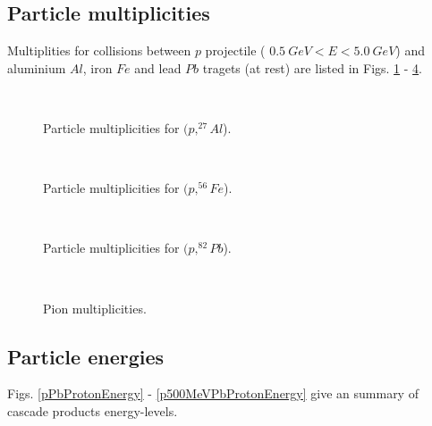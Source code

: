 \subsection{Particle multiplicities} 
\label{results:multiplicities}

Multiplities for collisions between $p$  projectile ( $0.5~GeV< E <5.0~GeV$) and aluminium $Al$, iron $Fe$ and lead $Pb$ tragets (at rest) are listed in Figs. \ref{pAlMultiplicity} - \ref{pPbPionMultiplicity}.

\begin{figure}
  \begin{center}
    \leavevmode
    \mbox{\epsfxsize=8cm  }
       \caption{Particle multiplicities for $(p, ^{27}Al$).}
  \label{pAlMultiplicity}
  \end{center}
\end{figure}

\begin{figure}
  \begin{center}
    \leavevmode
    \mbox{\epsfxsize=8cm  }
       \caption{Particle multiplicities for $(p, ^{56}Fe$).}
  \label{pFeMultiplicity}
  \end{center}
\end{figure}


\begin{figure}
  \begin{center}
    \leavevmode
    \mbox{\epsfxsize=8cm  }
       \caption{Particle multiplicities for $(p, ^{82}Pb$).}
  \label{pPbMultiplicity}
  \end{center}
\end{figure}


\begin{figure}
  \begin{center}
    \leavevmode
    \mbox{\epsfxsize=8cm  }
       \caption{Pion multiplicities.}
  \label{pPbPionMultiplicity}
  \end{center}
\end{figure}

\subsection{Particle energies} 
\label{results:energies}

Figs. \ref{pPbProtonEnergy} - \ref{p500MeVPbProtonEnergy} give an summary of cascade products energy-levels.

